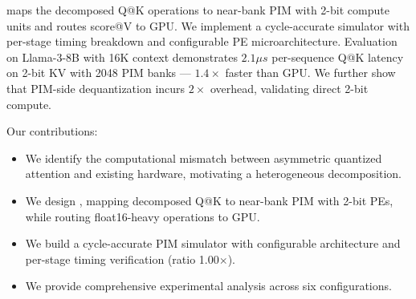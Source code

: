 \pimattn{} maps the decomposed Q@K operations to near-bank PIM with 2-bit compute units and routes score@V to GPU.
We implement a cycle-accurate simulator with per-stage timing breakdown and configurable PE microarchitecture.
Evaluation on Llama-3-8B with 16K context demonstrates $2.1\mu s$ per-sequence Q@K latency on 2-bit KV with 2048 PIM banks --- $1.4\times$ faster than GPU.
We further show that PIM-side dequantization incurs $2\times$ overhead, validating direct 2-bit compute.

Our contributions:
\begin{itemize}
\item We identify the computational mismatch between asymmetric quantized attention and existing hardware, motivating a heterogeneous decomposition.
\item We design \pimattn{}, mapping decomposed Q@K to near-bank PIM with 2-bit PEs, while routing float16-heavy operations to GPU.
\item We build a cycle-accurate PIM simulator with configurable architecture and per-stage timing verification (ratio 1.00$\times$).
\item We provide comprehensive experimental analysis across six configurations.
\end{itemize}
